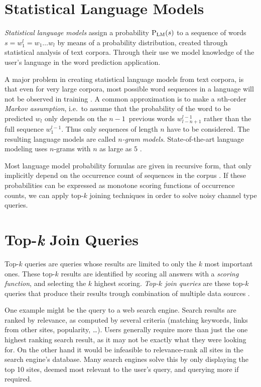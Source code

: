 \section{Statistical Language Models}
\label{sec:introduction-langmodels}

\emph{Statistical language models} assign a probability $\Prob[\text{LM}]{s}$ to
a sequence of words $s = w_1^l = w_1 \ldots w_l$ by means of a probability
distribution, created through statistical analysis of text corpora.
Through their use we model knowledge of the user's language in the word
prediction application.

A major problem in creating statistical language models from text corpora, is
that even for very large corpora, most possible word sequences in a language
will not be observed in training \noref.
A common approximation is to make a $n$th-order \emph{Markov assumption},
i.e.\ to assume that the probability of the word to be predicted $w_l$ only
depends on the $n\!-\!1$~previous words $w_{l-n+1}^{l-1}$ rather than the full
sequence $w_1^{l-1}$.
Thus only sequences of length $n$ have to be considered.
The resulting language models are called \emph{$n$-gram models}.
State-of-the-art language modeling uses $n$-grams with $n$ as large as $5$
\parencite{JurafskyMartin2009,Goodman2001,Stolcke2000}.

Most language model probability formulas are given in recursive form, that only
implicitly depend on the occurrence count of sequences in the corpus \noref.
If these probabilities can be expressed as monotone scoring functions of
occurrence counts, we can apply top-$k$ joining techniques in order to solve
noisy channel type queries.


\section{Top-\emph{k} Join Queries}
\label{sec:introduction-topkjoin}

Top-$k$ queries are queries whose results are limited to only the $k$ most
important ones.
These top-$k$ results are identified by scoring all answers with a
\emph{scoring function}, and selecting the $k$ highest scoring.
\emph{Top-$k$ join queries} are these top-$k$ queries that produce
their results trough combination of multiple data sources \parencite{Ilyas2008}.

One example might be the query to a web search engine.
Search results are ranked by relevance, as computed by several criteria
(matching keywords, links from other sites, popularity, \ldots).
Users generally require more than just the one highest ranking search result, as
it may not be exactly what they were looking for.
On the other hand it would be infeasible to relevance-rank all sites in the
search engine's database.
Many search engines solve this by only displaying the top 10 sites, deemed most
relevant to the user's query, and querying more if required.


